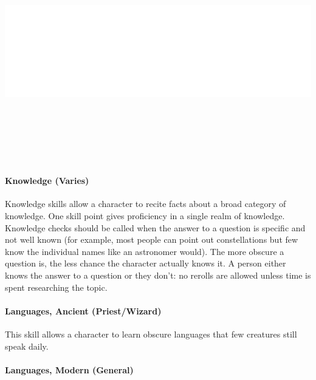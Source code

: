 \begin{multicols}{2}

\noindent\includegraphics[width=\columnwidth, height=3.75in]{testblock.pdf} 

\paragraph{Knowledge (Varies)}

Knowledge skills allow a character to recite facts about a broad category of knowledge.  One skill point gives proficiency in a single realm of knowledge.  Knowledge checks should be called when the answer to a question is specific and not well known (for example, most people can point out constellations but few know the individual names like an astronomer would).  The more obscure a question is, the less chance the character actually knows it.  A person either knows the answer to a question or they don't: no rerolls are allowed unless time is spent researching the topic.

\paragraph{Languages, Ancient (Priest/Wizard)}

This skill allows a character to learn obscure languages that few creatures still speak daily.  

\paragraph{Languages, Modern (General)}


\end{multicols}
